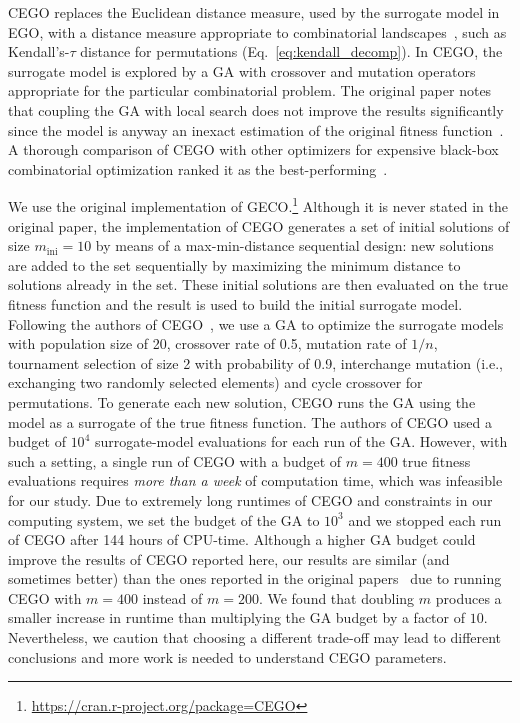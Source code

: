 \documentclass[sigconf,dvipsnames]{acmart}
\newcommand{\minit}{\ensuremath{m_\text{ini}}\xspace}
\newcommand{\FEmax}{\ensuremath{m}}
\begin{document}
CEGO replaces the Euclidean distance measure, used by the surrogate model in
EGO, with a distance measure appropriate to combinatorial
landscapes~\citep{ZaeStoBar2014:ppsn}, such as Kendall's-$\tau$ distance for
permutations (Eq.~\ref{eq:kendall_decomp}). In CEGO, the surrogate model is
explored by a GA with crossover and mutation operators appropriate for the
particular combinatorial problem. The original paper notes that coupling the GA
with local search does not improve the results significantly since the model is
anyway an inexact estimation of the original fitness
function~\citep[p.~875]{ZaeStoFriFisNauBar2014}. A thorough comparison of CEGO
with other optimizers for expensive black-box combinatorial optimization ranked
it as the best-performing~\citep{ZaeStoFriFisNauBar2014}.




We use the original implementation of GECO.\footnote{\url{https://cran.r-project.org/package=CEGO}} %
Although it is never stated in the original paper, the implementation of CEGO
generates a set of initial solutions of size $\minit=10$ by means of a
max-min-distance sequential design: new solutions are added to the set
sequentially by maximizing the minimum distance to solutions already in the
set. These initial solutions are then evaluated on the true fitness function
and the result is used to build the initial surrogate
model. %
Following the authors of
CEGO~\citep{ZaeStoFriFisNauBar2014,ZaeStoBar2014:ppsn}, we use a GA to optimize
the surrogate models with population size of 20, crossover rate of 0.5,
mutation rate of $1/n$, tournament selection of size 2 with probability of 0.9,
interchange mutation (i.e., exchanging two randomly selected elements) and
cycle crossover for permutations. To generate each new solution, CEGO runs the
GA using the model as a surrogate of the true fitness function.  The authors of
CEGO used a budget of $10^4$ surrogate-model evaluations for each run of the
GA. However, with such a setting, a single run of CEGO with a budget of
$\FEmax=400$ true fitness evaluations requires \emph{more than a week} of
computation time, which was infeasible for our study. Due to extremely long
runtimes of CEGO and constraints in our computing system, we set the budget of
the GA to $10^3$ and we stopped each run of CEGO after 144 hours of CPU-time.
Although a higher GA budget could improve the results of CEGO reported here,
our results are similar (and sometimes better) than the ones reported in the
original papers~\citep{ZaeStoFriFisNauBar2014,ZaeStoBar2014:ppsn} due to
running CEGO with $\FEmax=400$ instead of $\FEmax=200$. We found that
doubling $\FEmax$ produces a smaller increase in runtime than multiplying the
GA budget by a factor of $10$. Nevertheless, we caution that choosing a
different trade-off may lead to different conclusions and more work is needed
to understand CEGO parameters.
\end{document}
